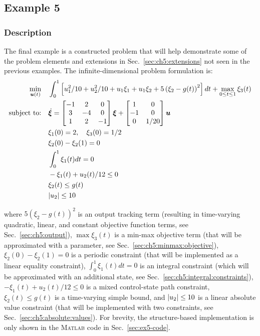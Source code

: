 \subsection{Example 5} \label{sec:ch5:example5}

\subsubsection{Description}

The final example is a constructed problem that will help demonstrate some of the problem elements and extensions in Sec.~\ref{sec:ch5:extensions} not seen in the previous examples.
The infinite-dimensional problem formulation is:%
\allowdisplaybreaks[1]%
\begin{subequations}%
\begin{align}
\min_{\bm{u}(t)} \quad & \int_0^1 \left[ u_1^2/10 + u_2^2/10 + u_1\xi_1 + u_1\xi_2 + 5\left(\xi_2-g(t)\right)^2 \right] dt + \max_{0\leq t\leq 1} \xi_3(t) \\
\text{subject to:} \quad & \dot{\bm{\xi}} = \begin{bmatrix} -1 & 2 & 0 \\ 3 & -4 & 0 \\ 1 & 2 & -1 \end{bmatrix} \bm{\xi} +
\begin{bmatrix} 1 & 0 \\ -1 & 0 \\ 0 & 1/20 \end{bmatrix} \bm{u} \\
& \xi_1(0) = 2, \quad \xi_3(0) = 1/2 \\
& \xi_2(0) - \xi_2(1) = 0 \\
& \int_0^1 \xi_1(t) dt = 0 \\
& -\xi_1(t) + u_2(t)/12 \leq 0 \\
& \xi_2(t) \leq g(t) \\
& \lvert u_2\rvert \leq 10 
\end{align}
\end{subequations}%
\allowdisplaybreaks[0]%

\noindent where 
$5\left(\xi_2-g(t)\right)^2$ is an output tracking term (resulting in time-varying quadratic, linear, and constant objective function terms, see Sec.~\ref{sec:ch5:output}),
$\max\xi_3(t)$ is a min-max objective term (that will be approximated with a parameter, see Sec.~\ref{sec:ch5:minmax:objective}),
$\xi_2(0) - \xi_2(1) = 0$ is a periodic constraint (that will be implemented as a linear equality constraint),
$\int_0^1 \xi_1(t) dt = 0$ is an integral constraint (which will be approximated with an additional state, see Sec.~\ref{sec:ch5:integral:constraints}),
$-\xi_1(t) + u_2(t)/12 \leq 0$ is a mixed control-state path constraint,
$\xi_2(t) \leq g(t) $ is a time-varying simple bound,
and
$\lvert u_2\rvert \leq 10 $ is a linear absolute value constraint (that will be implemented with two constraints, see Sec.~\ref{sec:ch5:absolute:values}).
For brevity, the structure-based implementation is only shown in the \textsc{Matlab} code in Sec.~\ref{sec:ex5-code}. 

